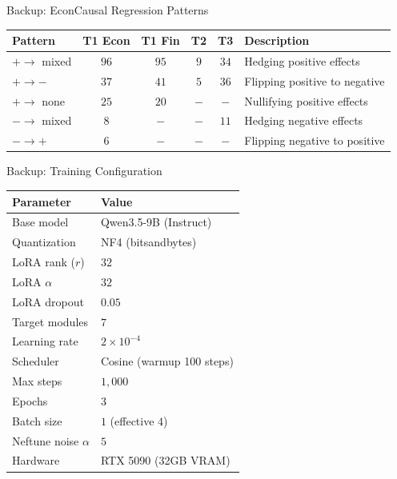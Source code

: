 \documentclass[aspectratio=169,12pt]{beamer}
\begin{document}
\begin{frame}{Backup: EconCausal Regression Patterns}
  \begin{center}
  \begin{tabular}{lccccl}
  \toprule
  Pattern & T1 Econ & T1 Fin & T2 & T3 & Description \\
  \midrule
  $+ \to$ mixed & $96$ & $95$ & $9$ & $34$ & Hedging positive effects \\
  $+ \to -$ & $37$ & $41$ & $5$ & $36$ & Flipping positive to negative \\
  $+ \to$ none & $25$ & $20$ & $-$ & $-$ & Nullifying positive effects \\
  $- \to$ mixed & $8$ & $-$ & $-$ & $11$ & Hedging negative effects \\
  $- \to +$ & $6$ & $-$ & $-$ & $-$ & Flipping negative to positive \\
  \bottomrule
  \end{tabular}
  \end{center}
\end{frame}

\begin{frame}{Backup: Training Configuration}
  \begin{center}
  \begin{tabular}{ll}
  \toprule
  Parameter & Value \\
  \midrule
  Base model & Qwen3.5-9B (Instruct) \\
  Quantization & NF4 (bitsandbytes) \\
  LoRA rank ($r$) & $32$ \\
  LoRA $\alpha$ & $32$ \\
  LoRA dropout & $0.05$ \\
  Target modules & $7$ \\
  Learning rate & $2\times10^{-4}$ \\
  Scheduler & Cosine (warmup 100 steps) \\
  Max steps & $1,000$ \\
  Epochs & $3$ \\
  Batch size & $1$ (effective $4$) \\
  Neftune noise $\alpha$ & $5$ \\
  Hardware & RTX 5090 (32GB VRAM) \\
  \bottomrule
  \end{tabular}
  \end{center}
\end{frame}



\end{document}

